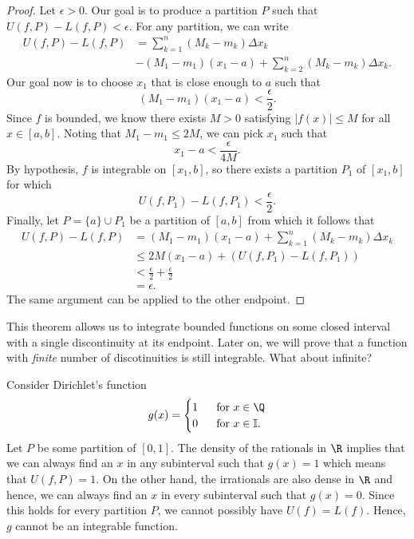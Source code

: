 \begin{proof}
Let \( \epsilon > 0  \). Our goal is to produce a partition \( P  \) such that \( U(f, P ) - L(f, P ) < \epsilon. \) For any partition, we can write 
\begin{align*}
    U(f, P ) - L(f,P ) &= \sum_{ k=1 }^{ n } (M_{k } - m_{k } ) \Delta x_{ k } \\
					   &- (M_{1} - m_{1})(x_{1} - a) + \sum_{ k=2 }^{ n } (M_{k} - m_{ k }) \Delta x_{k }.
\end{align*}
Our goal now is to choose \( x_{1} \) that is close enough to \( a \) such that 
\[  (M_{1} - m_{1})(x_{1} - a ) < \frac{ \epsilon  }{ 2 }. \] Since \( f  \) is bounded, we know there exists \( M > 0  \) satisfying \( | f(x)  | \leq M  \) for all \( x \in [a,b]  \). Noting that \( M_{1} - m_{1} \leq 2M \), we can pick \( x_{1} \) such that 
\[  x_{1} - a < \frac{ \epsilon  }{ 4 M  }. \] By hypothesis, \( f  \) is integrable on \( [x_{1}, b ] \), so there exists a partition \( P_{1}  \) of \( [x_{1}, b] \) for which 
\[  U(f, P_{1}) - L(f, P_{1}) < \frac{ \epsilon  }{ 2 }. \] Finally, let \( P = \{ a \} \cup P_{1} \) be a partition of \(  [a,b]  \) from which it follows that 
\begin{align*}
    U(f,P) - L(f,P) &= (M_{1} - m_{1})(x_{1} - a ) + \sum_{ k=1 }^{ n } (M_{k } - m_{k }) \Delta x_{k } \\
					&\leq 2M ( x_{1} - a ) + (U(f, P_{1}) - L(f,P_{1})) \\
					&< \frac{ \epsilon  }{ 2 }  + \frac{ \epsilon  }{ 2  } \\
					&= \epsilon.
\end{align*}
The same argument can be applied to the other endpoint.
\end{proof}

This theorem allows us to integrate bounded functions on some closed interval with a single discontinuity at its endpoint. Later on, we will prove that a function with \textit{finite} number of discotinuities is still integrable. What about infinite? 

\begin{ex}
Consider Dirichlet's function 
\[  g(x) = 
\begin{cases}
	1 \ &\text{ for } x \in \Q \\
	0 \ &\text{ for } x \in \mathbb{I}.
\end{cases}  \]
Let \( P  \) be some partition of \( [0,1]  \). The density of the rationals in \( \R  \) implies that we can always find an \( x   \) in any subinterval such that \( g(x) = 1  \) which means that \( U(f,P) = 1  \). On the other hand, the irrationals are also dense in \( \R  \) and hence, we can always find an \( x  \) in every subinterval such that \( g(x) = 0  \). Since this holds for every partition \( P  \), we cannot possibly have \( U(f) = L(f)   \). Hence, \( g  \) cannot be an integrable function.
\end{ex}

